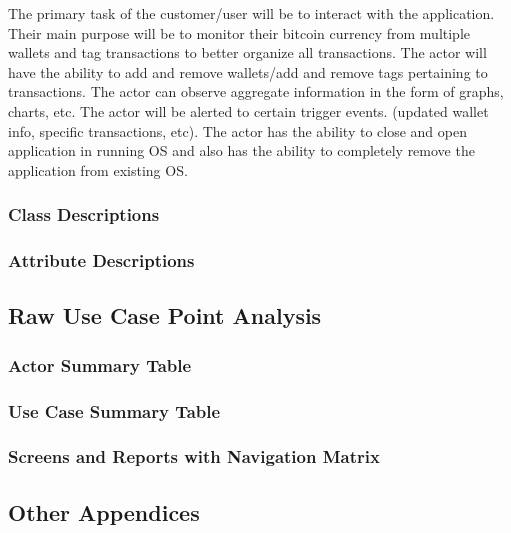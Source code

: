 The primary task of the customer/user will be to interact with the application.  Their main purpose will be to monitor their bitcoin currency from multiple wallets and tag transactions to better organize all transactions.  The actor will have the ability to add and remove wallets/add and remove tags pertaining to transactions. The actor can observe aggregate information in the form of graphs, charts, etc.  The actor will be alerted to certain trigger events. (updated wallet info, specific transactions, etc).  The actor has the ability to close and open application in running OS and also has the ability to completely remove the application from existing OS. \\
	
	
    \subsubsection{Class Descriptions}
    \subsubsection{Attribute Descriptions}
  \subsection{Raw Use Case Point Analysis}
    \subsubsection{Actor Summary Table}
    \subsubsection{Use Case Summary Table}
    \subsubsection{Screens and Reports with Navigation Matrix}
  \subsection{Other Appendices}
